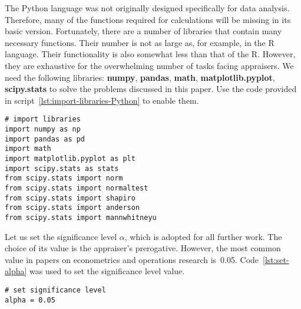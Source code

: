 \documentclass[]{scrreprt}
\begin{document}
The Python language was not originally designed specifically for data analysis. Therefore, many of the functions required for calculations will be missing in its basic version. Fortunately, there are a number of libraries that contain many necessary functions. Their number is not as large as, for example, in the R language. Their functionality is also somewhat less than that of the R. However, they are exhaustive for the overwhelming number of tasks facing appraisers. We need the following libraries: \textbf{numpy}, \textbf{pandas},\textbf{ math}, \textbf{matplotlib.pyplot}, \textbf{scipy.stats} to solve the problems discussed in this paper. Use the code provided in script~\ref{lst:import-libraries-Python} to enable them.
\begin{lstlisting}[float=htp, caption = Enabling the required libraries, firstnumber=1, label= lst:import-libraries-Python]
# import libraries
import numpy as np
import pandas as pd
import math
import matplotlib.pyplot as plt
import scipy.stats as stats
from scipy.stats import norm
from scipy.stats import normaltest
from scipy.stats import shapiro
from scipy.stats import anderson
from scipy.stats import mannwhitneyu
\end{lstlisting}
%

Let us set the significance level $\alpha$, which is adopted for all further work. The choice of its value is the appraiser's prerogative. However, the most common value in papers on econometrics and operations research is~0.05. Code~\ref{lst:set-alpha} was used to set the significance level value.
%
\begin{lstlisting}[float=htp, caption = Set the applicable level of significance, firstnumber=1, label= lst:set-alpha]
# set significance level
alpha = 0.05
\end{lstlisting}
% 
\end{document}
